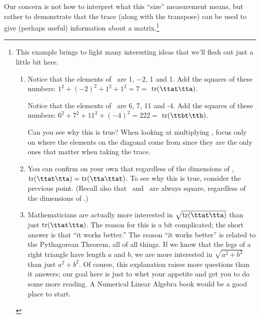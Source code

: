 Our concern is not how to interpret what this ``size'' measurement means, but rather to demonstrate that the trace (along with the transpose) can be used to give (perhaps useful) information about a matrix.\footnote{This example brings to light many interesting ideas that we'll flesh out just a little bit here. 
\begin{enumerate}
\item		Notice that the elements of \tta\ are 1, $-2$,  1 and 1. Add the squares of these numbers: $1^2 + (-2)^2 + 1^2 + 1^2  = 7 = $ $\tr(\ttat\tta)$.

				Notice that the elements of \ttb\ are 6, 7, 11 and -4. Add the squares of these numbers: $6^2 + 7^2 + 11^2 + (-4)^2 = 222 =$ $\tr(\ttbt\ttb)$.
				
				Can you see why this is true? When looking at multiplying \ttat\tta, focus only on where the elements on the diagonal come from since they are the only ones that matter when taking the trace.

\item		You can confirm on your own that regardless of the dimensions of \tta, $\tr(\ttat\tta) = \tr(\tta\ttat)$. To see why this is true, consider the previous point. (Recall also that \ttat\tta\ and \tta\ttat\ are always square, regardless of the dimensions of \tta.)

\item		Mathematicians are actually more interested in $\sqrt{\tr(\ttat\tta)}$ than just $\tr(\ttat\tta)$. The reason for this is a bit complicated; the short answer is that ``it works better.'' The reason ``it works better'' is related to the Pythagorean Theorem, all of all things. If we know that the legs of a right triangle have length $a$ and $b$, we are more interested in $\sqrt{a^2+b^2}$ than just $a^2+b^2$. Of course, this explanation raises more questions than it answers; our goal here is just to whet your appetite and get you to do some more reading. A Numerical Linear Algebra book would be a good place to start.
\end{enumerate}
}\\





